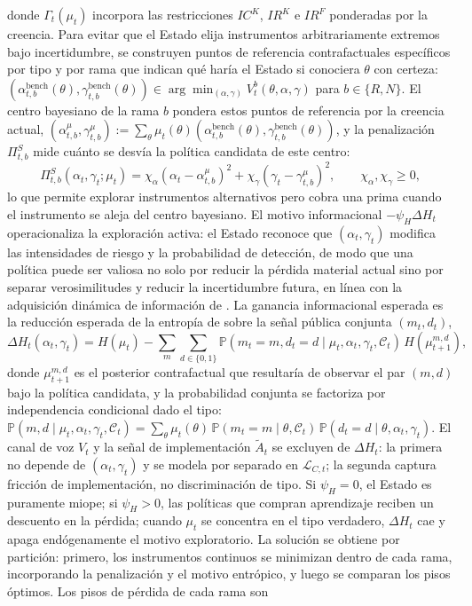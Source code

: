 \documentclass[review,authoryear,12pt]{elsarticle}
\theoremstyle{plain}
\theoremstyle{definition}
\newcommand{\Prob}{\mathbb{P}}
\newcommand{\1}{\mathbf{1}}
\begin{document}
donde $\Gamma_t(\mu_t)$ incorpora las restricciones $IC^K$, $IR^K$ e $IR^F$ ponderadas por la creencia. Para evitar que el Estado elija instrumentos arbitrariamente extremos bajo incertidumbre, se construyen puntos de referencia contrafactuales específicos por tipo y por rama que indican qué haría el Estado si conociera $\theta$ con certeza: $(\alpha_{t,b}^{\mathrm{bench}}(\theta),\gamma_{t,b}^{\mathrm{bench}}(\theta))\in\arg\min_{(\alpha,\gamma)}V_t^b(\theta,\alpha,\gamma)$ para $b\in\{R,N\}$. El centro bayesiano de la rama $b$ pondera estos puntos de referencia por la creencia actual, $(\alpha_{t,b}^{\mu},\gamma_{t,b}^{\mu}):=\sum_\theta\mu_t(\theta)(\alpha_{t,b}^{\mathrm{bench}}(\theta),\gamma_{t,b}^{\mathrm{bench}}(\theta))$, y la penalización $\Pi_{t,b}^S$ mide cuánto se desvía la política candidata de este centro:
\begin{equation}
\Pi_{t,b}^S(\alpha_t,\gamma_t;\mu_t)=\chi_\alpha(\alpha_t-\alpha_{t,b}^{\mu})^2+\chi_\gamma(\gamma_t-\gamma_{t,b}^{\mu})^2,\qquad\chi_\alpha,\chi_\gamma\ge 0,
\label{eq:prima-desviacion}
\end{equation}
lo que permite explorar instrumentos alternativos pero cobra una prima cuando el instrumento se aleja del centro bayesiano. El motivo informacional $-\psi_H\Delta H_t$ operacionaliza la exploración activa: el Estado reconoce que $(\alpha_t,\gamma_t)$ modifica las intensidades de riesgo y la probabilidad de detección, de modo que una política puede ser valiosa no solo por reducir la pérdida material actual sino por separar verosimilitudes y reducir la incertidumbre futura, en línea con la adquisición dinámica de información de \citet{Zhong2022}. La ganancia informacional esperada es la reducción esperada de la entropía de \citet{Shannon1948} sobre la señal pública conjunta $(m_t,d_t)$,
\begin{equation}
\Delta H_t(\alpha_t,\gamma_t)=H(\mu_t)-\sum_{m}\sum_{d\in\{0,1\}}\Prob(m_t=m,d_t=d\mid\mu_t,\alpha_t,\gamma_t,\mathcal{C}_t)\,H(\mu_{t+1}^{m,d}),
\label{eq:delta-H}
\end{equation}
donde $\mu_{t+1}^{m,d}$ es el posterior contrafactual que resultaría de observar el par $(m,d)$ bajo la política candidata, y la probabilidad conjunta se factoriza por independencia condicional dado el tipo: $\Prob(m,d\mid\mu_t,\alpha_t,\gamma_t,\mathcal{C}_t)=\sum_{\theta}\mu_t(\theta)\,\Prob(m_t=m\mid\theta,\mathcal{C}_t)\,\Prob(d_t=d\mid\theta,\alpha_t,\gamma_t)$. El canal de voz $V_t$ y la señal de implementación $\tilde{A}_t$ se excluyen de $\Delta H_t$: la primera no depende de $(\alpha_t,\gamma_t)$ y se modela por separado en $\mathcal{L}_{C,t}$; la segunda captura fricción de implementación, no discriminación de tipo. Si $\psi_H=0$, el Estado es puramente miope; si $\psi_H>0$, las políticas que compran aprendizaje reciben un descuento en la pérdida; cuando $\mu_t$ se concentra en el tipo verdadero, $\Delta H_t$ cae y apaga endógenamente el motivo exploratorio. La solución se obtiene por partición: primero, los instrumentos continuos se minimizan dentro de cada rama, incorporando la penalización y el motivo entrópico, y luego se comparan los pisos óptimos. Los pisos de pérdida de cada rama son
\end{document}
